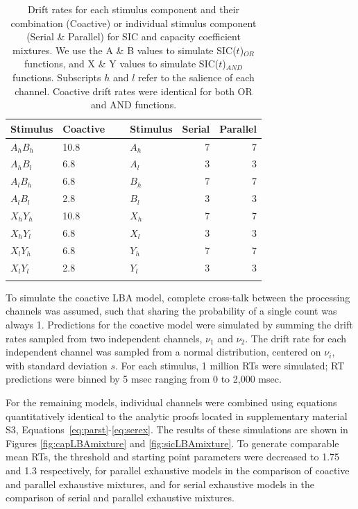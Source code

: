 \begin{table}[htb]
\centering
\caption{Drift rates for each stimulus component and their combination (Coactive) or individual stimulus component (Serial \& Parallel) for SIC and capacity coefficient mixtures. We use the A \& B values to simulate SIC($t$)$_{OR}$ functions, and X \& Y values to simulate SIC($t$)$_{AND}$ functions. Subscripts $h$ and $l$ refer to the salience of each channel. Coactive drift rates were identical for both OR and AND functions.}
\begin{tabular}{l l l l r r } 
\hline
Stimulus & Coactive   		& ~ & Stimulus   &  Serial 	& Parallel 	\\
\hline
$A_hB_h$ & 10.8             & ~ & $A_h$      & 7         & 7         \\
$A_hB_l$ & 6.8              & ~ & $A_l$      & 3         & 3         \\
$A_lB_h$ & 6.8              & ~ & $B_h$      & 7         & 7         \\
$A_lB_l$ & 2.8              & ~ & $B_l$      & 3         & 3         \\
$X_hY_h$ & 10.8             & ~ & $X_h$      & 7         & 7         \\
$X_hY_l$ & 6.8              & ~ & $X_l$      & 3         & 3         \\
$X_lY_h$ & 6.8              & ~ & $Y_h$      & 7         & 7         \\
$X_lY_l$ & 2.8              & ~ & $Y_l$      & 3         & 3    
\\
\hline
\hline
\label{tab:lba_drifts}
\end{tabular} 
\end{table}

To simulate the coactive LBA model, complete cross-talk between the processing channels was assumed, such that sharing the probability of a single count was always 1. Predictions for the coactive model were simulated by summing the drift rates sampled from two independent channels, $\nu_{1}$ and $\nu_{2}$. The drift rate for each independent channel was sampled from a normal distribution, centered on $\nu_i$, with standard deviation $s$. For each stimulus, 1 million RTs were simulated; RT predictions were binned by 5 msec ranging from 0 to 2,000 msec.

For the remaining models, individual channels were combined using equations quantitatively identical to the analytic proofs located in supplementary material S3, Equations~\ref{eq:parst}-\ref{eq:serex}. The results of these simulations are shown in Figures \ref{fig:capLBAmixture} and \ref{fig:sicLBAmixture}. To generate comparable mean RTs, the threshold and starting point parameters were decreased to 1.75 and 1.3 respectively, for parallel exhaustive models in the comparison of coactive and parallel exhaustive mixtures, and for serial exhaustive models in the comparison of serial and parallel exhaustive mixtures.

